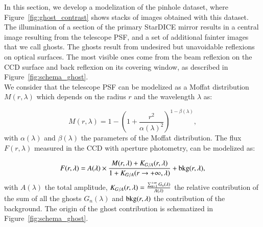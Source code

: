 In this section, we develop a modelization of the \spinhole pinhole dataset, where Figure~\ref{fig:ghost_contrast} shows stacks of images obtained with this dataset. The illumination of a section of the primary StarDICE mirror results in a central image resulting from the \SD telescope PSF, and a set of additional fainter images that we call ghosts. The ghosts result from undesired but unavoidable reflexions on optical surfaces. The most visible ones come from the beam reflexion on the CCD surface and back reflexion on its covering window, as described in Figure~\ref{fig:schema_ghost}.\\

We consider that the \SD telescope PSF can be modelized as a Moffat distribution \citep{moffat} $M(r, \lambda)$ which depends on the radius $r$ and the wavelength $\lambda$ as:

\begin{equation}
M(r, \lambda)= 1 - \left( 1+\frac{r^2}{\alpha(\lambda)^2} \right)^{1-\beta(\lambda)},
\end{equation}
with $\alpha(\lambda)$ and $\beta(\lambda)$ the parameters of the Moffat distribution. The flux $F(r, \lambda)$ measured in the CCD with aperture photometry, can be modelized as: 


\begin{equation}
F(r, \lambda) = A(\lambda) \times \frac{M(r, \lambda) + K_{G/A}(r, \lambda)}{1 + K_{G/A}(r \rightarrow +\infty, \lambda)} + \mathrm{bkg}(r, \lambda),
\label{eq:moffat_model}
\end{equation}
with $A(\lambda)$ the total amplitude, $K_{G/A}(r, \lambda) = \frac{\sum_{n=1}^{+\infty} G_n(\lambda)}{A(\lambda)}$ the relative contribution of the sum of all the ghosts $G_n(\lambda)$ and $\mathrm{bkg}(r, \lambda)$ the contribution of the background. The origin of the ghost contribution is schematized in Figure~\ref{fig:schema_ghost}.

